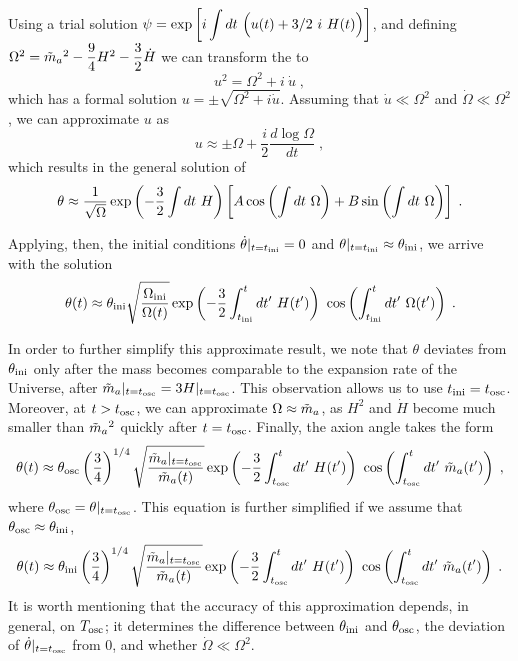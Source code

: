 \documentclass[11pt,a4paper]{article}
\begin{document}
Using a trial solution $\psi = \exp\left[  i \displaystyle \int d t \ \Big( u(t) +3/2 \ i \ H(t) \Big)  \right]$, and defining $\Omega^2 = \tilde m_{a}{}^2 - \dfrac{9}{4} H^2 -  \dfrac{3}{2} \dot H $ we can transform the  to 
%
\begin{equation}
	u^2 = \Omega^2 + i \ \dot u \; ,
	\label{eq:eom_of_u}
\end{equation}
%
which has a formal solution $u = \pm \sqrt{\Omega^2 + i \dot u}$. Assuming that $\dot u \ll \Omega^2$ and $\dot \Omega \ll \Omega^2$, we can approximate $u$ as
%
\begin{equation}
	u \approx \pm \Omega + \dfrac{i}{2} \dfrac{d \log \Omega}{d t} \;,
	\label{eq:u_approx}
\end{equation}
%
which results in the general solution of  
%
\begin{equation}
	\theta \approx \dfrac{1}{\sqrt{\Omega}} \exp\left( -\dfrac{3}{2} \int d t \ H \right) \left[  A \cos\left(  \int d t \ \Omega \right) +  B \sin\left(  \int d t \ \Omega \right)     \right] \;. 
	\label{eq:general_solution_eom_approx}
\end{equation}

Applying, then, the initial conditions $ \dot \theta |_{t=t_{\rm ini}{}} = 0$ and  $\theta|_{t=t_{\rm ini}{}} \approx \theta_{\rm ini}{}$, we arrive with the solution 
%
\begin{equation}
	\theta(t) \approx \theta_{\rm ini}{} \sqrt{ \dfrac{ \Omega_{\rm ini} }{\Omega (t)} } \exp\left( -\dfrac{3}{2} \int_{t_{\rm ini}{}}^t d t^\prime  \ H(t^\prime) \right) \  \cos\left(  \int_{t_{\rm ini}{}}^t d t^\prime  \ \Omega(t^\prime) \right)   \;.
	\label{eq:solution_eom_approx} 
\end{equation}


In order to further simplify this approximate result, we note that $\theta$ deviates from $\theta_{\rm ini}{}$ only after the mass becomes comparable to the expansion rate of the Universe, \ie after $\tilde m_{a}{}|_{t = t_{\rm osc}{}} = 3 H|_{t = t_{\rm osc}{}}$. This observation allows us to use $t_{\rm ini}{} = t_{\rm osc}{}$.  Moreover, at $t> t_{\rm osc}{}$, we can approximate $\Omega \approx \tilde m_{a}{}$, as $H^2$ and $\dot H$ become much smaller than $\tilde m_{a}{}^2$ quickly after $t=t_{\rm osc}{}$. Finally, the axion angle takes the form
%
\begin{equation}
	\theta(t) \approx \thetaosc \lrb{\dfrac{3}{4}}^{1/4} \sqrt{ \dfrac{ \maT|_{t=\tosc} }{\maT  (t)} } \exp\lrb{-\dfrac{3}{2} \int_{\tosc}^t d t^\prime  \ H(t^\prime)} \  \cos\lrb{ \int_{\tosc}^t d t^\prime  \ \maT(t^\prime)}   \;,
	\label{eq:solution_eom_approx_theta_osc} 
\end{equation}
%
where $\theta_{\rm osc}{} = \theta|_{t=t_{\rm osc}{}}$. This equation is further simplified if we assume that $\theta_{\rm osc}{} \approx \theta_{\rm ini}{}$, \ie
%
\begin{equation}
	\theta(t) \approx \theta_{\rm ini}{} \left( \dfrac{3}{4} \right)^{1/4} \sqrt{ \dfrac{ \tilde m_{a}{}|_{t=t_{\rm osc}{}} }{\tilde m_{a}{}  (t)} } \exp\left( -\dfrac{3}{2} \int_{t_{\rm osc}{}}^t d t^\prime  \ H(t^\prime) \right) \  \cos\left(  \int_{t_{\rm osc}{}}^t d t^\prime  \ \tilde m_{a}{}(t^\prime) \right)   \;.
	\label{eq:solution_eom_approx_final} 
\end{equation}
%
It is worth mentioning that the accuracy of this approximation depends, in general, on $T_{\rm osc}{}$; it determines the difference between $\theta_{\rm ini}{}$ and $\theta_{\rm osc}{}$, the deviation of $\dot \theta|_{t=t_{\rm osc}{}}$ from $0$, and whether $\dot \Omega \ll \Omega^2$. 
\end{document}
